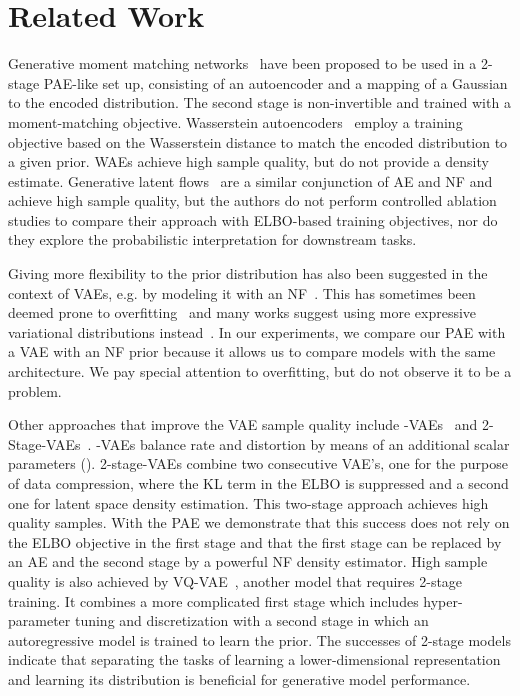 \documentclass[10pt]{article} \usepackage[accepted]{tmlr}
\begin{document}
\section{Related Work}
\label{sec:rel_work}
 Generative moment matching networks~\citep{GMMN} have been proposed to be used in a 2-stage PAE-like set up, consisting of an autoencoder and a mapping of a Gaussian to the encoded distribution. The second stage is non-invertible and trained with a moment-matching objective. Wasserstein autoencoders~\citep{WAE} employ a training objective based on the Wasserstein distance to match the encoded distribution to a given prior. WAEs achieve high sample quality, but do not provide a density estimate. Generative latent flows~\citep{GLF} are a similar conjunction of AE and NF and achieve high sample quality, but the authors do not perform controlled ablation studies to compare their approach with ELBO-based training objectives, nor do they explore the probabilistic interpretation for downstream tasks.

Giving more flexibility to the prior distribution has also been suggested in the context of VAEs, e.g. by modeling it with an NF~\citep{BauerM19,KSDDSSA17, TomczakW17Vamp}. This has sometimes been deemed prone to overfitting~\citep{TomczakW17Vamp} and many works suggest using more expressive variational distributions instead~\citep{KingmaSW16,RezendeM15, SalimansKW15, TranRB15}. In our experiments, we compare our PAE with a VAE with an NF prior because it allows us to compare models with the same architecture. We pay special attention to overfitting, but do not observe it to be a problem.

Other approaches that improve the VAE sample quality include -VAEs~\citep{tishby2000,Alemi2016,Tkacik2018,beta-VAE} and
2-Stage-VAEs~\citep{2StageVAE}.
-VAEs balance rate and distortion by means of an additional scalar parameters (). 2-stage-VAEs combine two consecutive VAE's, one for the purpose of data compression, where the KL term in the ELBO is suppressed and a second one for latent space density estimation. 
This two-stage approach achieves high quality samples. With the PAE we demonstrate that this success does not rely on the ELBO objective in the first stage and that the first stage can be replaced by an AE and the second stage by a powerful NF density estimator. High sample quality is also achieved by VQ-VAE~\citep{OordVK17,RazaviOV19}, another model that requires 2-stage training. It combines a more complicated first stage which includes hyper-parameter tuning and discretization with a second stage in which an autoregressive model is trained to learn the prior. The successes of 2-stage models indicate that separating the tasks of learning a lower-dimensional representation and learning its distribution is beneficial for generative model performance.
\end{document}
